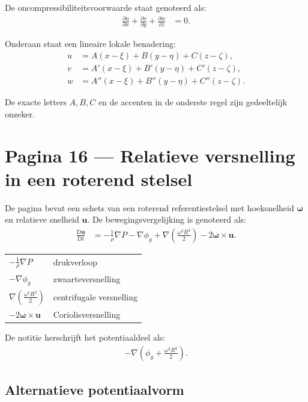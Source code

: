 \documentclass[11pt]{article}
\newcommand{\D}{\mathrm{D}}
\newcommand{\vect}[1]{\mathbf{#1}}
\newcommand{\onzeker}[1]{\textcolor{red!70!black}{#1}}
\begin{document}
De oncompressibiliteitsvoorwaarde staat genoteerd als:
\begin{align*}
\frac{\partial u}{\partial x}
+
\frac{\partial v}{\partial y}
+
\frac{\partial w}{\partial z}
  &=
  0.
\end{align*}

Onderaan staat een lineaire lokale benadering:
\begin{align*}
u
  &=
  A\left(x-\xi\right)+B\left(y-\eta\right)+C\left(z-\zeta\right),
\\
v
  &=
  A'\left(x-\xi\right)+B'\left(y-\eta\right)+C'\left(z-\zeta\right),
\\
w
  &=
  A''\left(x-\xi\right)+B''\left(y-\eta\right)+C''\left(z-\zeta\right).
\end{align*}

De exacte letters $A,B,C$ en de accenten in de onderste regel zijn gedeeltelijk \onzeker{onzeker}.

\section*{Pagina 16 --- Relatieve versnelling in een roterend stelsel}

De pagina bevat een schets van een roterend referentiestelsel met hoeksnelheid $\bm{\omega}$ en relatieve snelheid $\vect{u}$. De bewegingsvergelijking is genoteerd als:
\begin{align*}
\frac{\D\vect{u}}{\D t}
  &=
  -\frac{1}{\rho}\nabla P
  -\nabla \phi_g
  +\nabla\left(\frac{\omega^2R^2}{2}\right)
  -2\bm{\omega}\times\vect{u}.
\end{align*}

\begin{center}
\begin{tabular}{>{\raggedright\arraybackslash}p{5.3cm}p{8.5cm}}
$-\frac{1}{\rho}\nabla P$ & drukverloop \\
$-\nabla\phi_g$ & zwaarteversnelling \\
$\nabla\left(\frac{\omega^2R^2}{2}\right)$ & centrifugale versnelling \\
$-2\bm{\omega}\times\vect{u}$ & Coriolisversnelling
\end{tabular}
\end{center}

De notitie herschrijft het potentiaaldeel als:
\begin{align*}
-\nabla\left(\phi_g+\frac{\omega^2R^2}{2}\right).
\end{align*}

\subsection*{Alternatieve potentiaalvorm}
\end{document}
